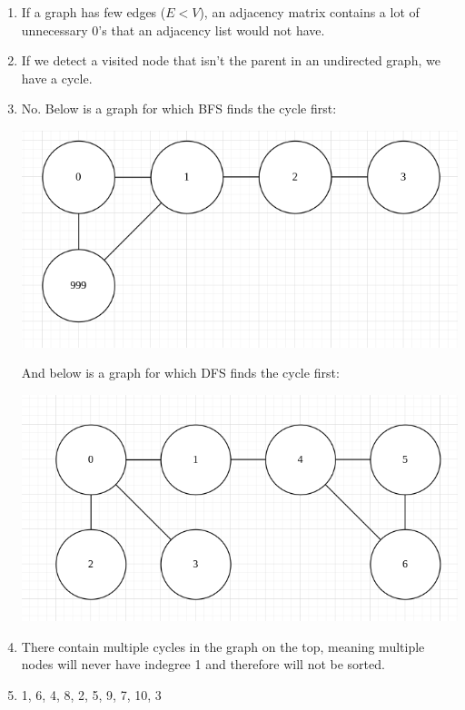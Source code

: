 \documentclass[a4paper,10pt]{article}
\begin{document}
\begin{enumerate}
\item If a graph has few edges ($E < V$), an adjacency matrix contains a lot of unnecessary 0's that an adjacency list would not have.

\item If we detect a visited node that isn't the parent in an undirected graph, we have a cycle.

\item No. Below is a graph for which BFS finds the cycle first:

\includegraphics[scale=0.25]{hw3_fig1}

And below is a graph for which DFS finds the cycle first:

\includegraphics[scale=0.25]{hw3_fig2}

\item There contain multiple cycles in the graph on the top,  meaning multiple nodes will never have indegree 1 and therefore will not be sorted.

\item 1, 6, 4, 8, 2, 5, 9, 7, 10, 3

\end{enumerate}
\end{document}
